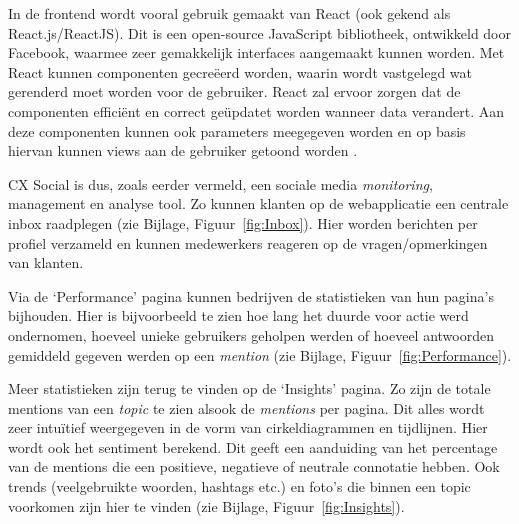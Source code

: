 In de frontend wordt vooral gebruik gemaakt van React (ook gekend als React.js/ReactJS). Dit is een open-source JavaScript bibliotheek, ontwikkeld door Facebook, waarmee zeer gemakkelijk interfaces aangemaakt kunnen worden. Met React kunnen componenten gecre\"{e}erd worden, waarin wordt vastgelegd wat gerenderd moet worden voor de gebruiker. React zal ervoor zorgen dat de componenten effici\"{e}nt en correct ge\"{u}pdatet worden wanneer data verandert. Aan deze componenten kunnen ook parameters meegegeven worden en op basis hiervan kunnen views aan de gebruiker getoond worden \cite{React}. 

CX Social is dus, zoals eerder vermeld, een sociale media \textit{monitoring}, management en analyse tool. Zo kunnen klanten op de webapplicatie een centrale inbox raadplegen (zie Bijlage, Figuur~\ref{fig:Inbox}). Hier worden berichten per profiel verzameld en kunnen medewerkers reageren op de vragen/opmerkingen van klanten.
 

Via de `Performance' pagina kunnen bedrijven de statistieken van hun pagina's bijhouden. Hier is bijvoorbeeld te zien hoe lang het duurde voor actie werd ondernomen, hoeveel unieke gebruikers geholpen werden of hoeveel antwoorden gemiddeld gegeven werden op een \textit{mention} (zie Bijlage, Figuur~\ref{fig:Performance}).

Meer statistieken zijn terug te vinden op de `Insights' pagina. Zo zijn de totale mentions van een \textit{topic} te zien alsook de \textit{mentions} per pagina. Dit alles wordt zeer intu\"{i}tief  weergegeven in de vorm van cirkeldiagrammen en tijdlijnen. Hier wordt ook het sentiment berekend. Dit geeft een aanduiding van het percentage van de mentions die een positieve, negatieve of neutrale connotatie hebben. Ook trends (veelgebruikte woorden, hashtags  etc.) en foto's die binnen een topic voorkomen zijn hier te vinden (zie Bijlage, Figuur~\ref{fig:Insights}).  



